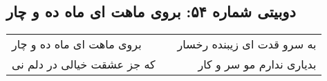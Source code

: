 \begin{center}
\section*{دوبیتی شماره ۵۴: بروی ماهت ای ماه ده و چار}
\label{sec:054}
\begin{longtable}{l p{0.5cm} r}
بروی ماهت ای ماه ده و چار
&&
به سرو قدت ای زیبنده رخسار
\\
که جز عشقت خیالی در دلم نی
&&
بدیاری ندارم مو سر و کار
\\
\end{longtable}
\end{center}
